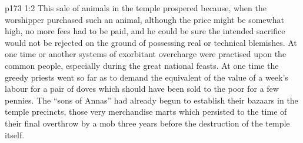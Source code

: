 \vs p173 1:2 This sale of animals in the temple prospered because, when the worshipper purchased such an animal, although the price might be somewhat high, no more fees had to be paid, and he could be sure the intended sacrifice would not be rejected on the ground of possessing real or technical blemishes. At one time or another systems of exorbitant overcharge were practised upon the common people, especially during the great national feasts. At one time the greedy priests went so far as to demand the equivalent of the value of a week’s labour for a pair of doves which should have been sold to the poor for a few pennies. The “sons of Annas” had already begun to establish their bazaars in the temple precincts, those very merchandise marts which persisted to the time of their final overthrow by a mob three years before the destruction of the temple itself.
